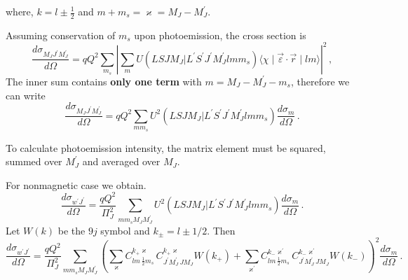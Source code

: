 \documentclass[a4paper,oneside,12pt]{extarticle}
\begin{document}
%
where, $k=l\pm\frac{1}{2}$ and $m+m_s=\varkappa=M_J-M_J^\prime$.

Assuming conservation of $m_s$ upon photoemission, the cross section is
\begin{equation}
\frac{d \sigma_{M_J J^{\prime} M_J^{\prime}}}{d \Omega} = q Q^2
\sum_{m_s} \left| \sum_m U(LSJM_J | L^{\prime} S^{\prime} J^{\prime} M_J^{\prime} l m m_s) 
\langle \chi \mid \vec{\varepsilon} \cdot \vec{r}  \mid lm \rangle \right|^2 \,,
\end{equation}
The inner sum contains \textbf{only one term} with $m=M_J-M_J^\prime-m_s$, therefore we can write
\begin{equation}
\frac{d \sigma_{M_J J^{\prime} M_J^{\prime}}}{d \Omega} = q Q^2
\sum_{m m_s} U^2(LSJM_J | L^{\prime} S^{\prime} J^{\prime} M_J^{\prime} l m m_s) \frac{d \sigma_{m}}{d \Omega} \,.
\label{sigmaMagn}
\end{equation}

To calculate photoemission intensity, the matrix element must be squared, summed over $M_J^\prime$ and averaged over $M_J$.

For nonmagnetic case we obtain. 
$$
\frac{d \sigma_{w^{\prime}J^{\prime}}}{d \Omega} = \frac{q Q^2}{\Pi^2_{J}}
\sum_{m m_s M_J M_J^\prime} U^2(LSJM_J | L^{\prime} S^{\prime} J^{\prime} M_J^{\prime} l m m_s) \frac{d \sigma_{m}}{d \Omega} \,.
$$
Let $W(k)$ be the $9j$ symbol and $k_{\pm}=l\pm 1/2$. Then
$$
\frac{d \sigma_{w^{\prime}J^{\prime}}}{d \Omega} = \frac{qQ^2}{\Pi^2_{J}}
\sum_{m m_s M_J M_J^\prime} \left( \sum_{\varkappa} C^{k_+ \varkappa}_{lm \, \frac{1}{2}m_s} \,
C^{k_+ \varkappa}_{J^{\prime} M_J^{\prime} \, J M_J} W(k_+) +
\sum_{\varkappa^\prime} C^{k_- \varkappa^\prime}_{lm \, \frac{1}{2}m_s} \,
C^{k_- \varkappa^\prime}_{J^{\prime} M_J^{\prime} \, J M_J} W(k_-) \right)^2 \frac{d \sigma_m}{d \Omega} \,.
$$
\end{document}
